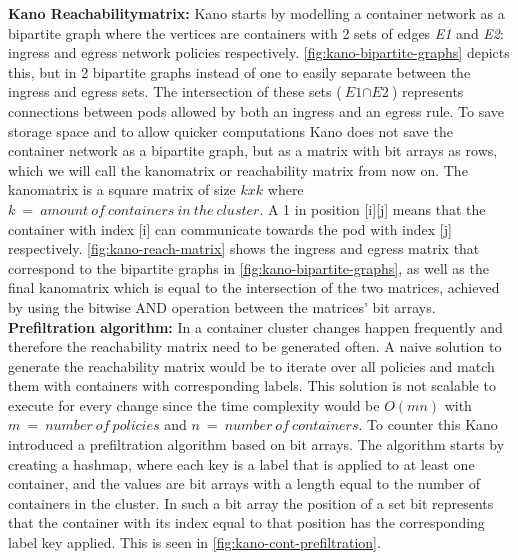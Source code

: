 \textbf{Kano Reachabilitymatrix:} \label{kano:matrix} Kano starts by modelling a container network as a bipartite graph where the vertices are containers with 2 sets of edges \textit{E1} and \textit{E2}: ingress and egress network policies respectively. \autoref{fig:kano-bipartite-graphs} depicts this, but in 2 bipartite graphs instead of one to easily separate between the ingress and egress sets. The intersection of these sets  ($\textit{E1} \cap \textit{E2}$) represents connections between pods allowed by both an ingress and an egress rule. To save storage space and to allow quicker computations Kano does not save the container network as a bipartite graph, but as a matrix with bit arrays as rows, which we will call the kanomatrix or reachability matrix from now on. The kanomatrix is a square matrix of size \(kxk\) where \(k\ =\ amount\  of\  containers\  in\  the\  cluster\). A 1 in position [i][j] means that the container with index [i] can communicate towards the pod with index [j] respectively. \autoref{fig:kano-reach-matrix} shows the ingress and egress matrix that correspond to the bipartite graphs in \autoref{fig:kano-bipartite-graphs}, as well as the final kanomatrix which is equal to the intersection of the two matrices, achieved by using the bitwise AND operation between the matrices' bit arrays.
\\[10pt]

\textbf{Prefiltration algorithm:} \label{kano:prefiltration} In a container cluster changes happen frequently and therefore the reachability matrix need to be generated often. A naive solution to generate the reachability matrix would be to iterate over all policies and match them with containers with corresponding labels. This solution is not scalable to execute for every change since the time complexity would be $O(mn)$ with $m\ =\ number\ of\ policies$ and $n\ =\ number\ of\ containers$. To counter this Kano introduced a prefiltration algorithm based on bit arrays. The algorithm starts by creating a hashmap, where each key is a label that is applied to at least one container, and the values are bit arrays with a length equal to the number of containers in the cluster. In such a bit array the position of a set bit represents that the container with its index equal to that position has the corresponding label key applied. This is seen in \autoref{fig:kano-cont-prefiltration}.
\\[10pt] 

